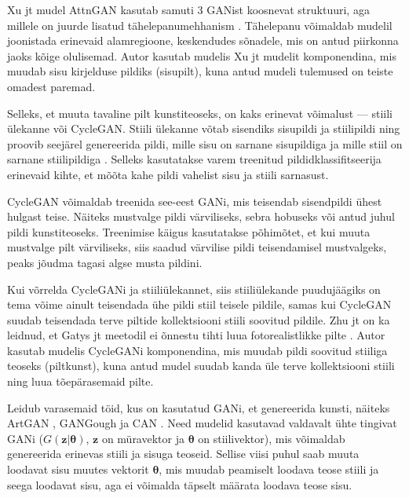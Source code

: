 \documentclass{vilgym}
\begin{document}
	Xu jt mudel AttnGAN kasutab samuti 3 GANist koosnevat struktuuri, aga millele on juurde lisatud tähelepanumehhanism \parencite{attngan}. Tähelepanu võimaldab mudelil joonistada erinevaid alamregioone, keskendudes sõnadele, mis on antud piirkonna jaoks kõige olulisemad. Autor kasutab mudelis Xu jt mudelit komponendina, mis muudab sisu kirjelduse pildiks (sisu\textrightarrow pilt), kuna antud mudeli tulemused on teiste omadest paremad. 

	Selleks, et muuta tavaline pilt kunstiteoseks, on kaks erinevat võimalust --- stiili ülekanne või CycleGAN. Stiili ülekanne võtab sisendiks sisupildi ja stiilipildi ning proovib seejärel genereerida pildi, mille sisu on sarnane sisupildiga ja mille stiil on sarnane stiilipildiga \parencite{styletransfer}.
	Selleks kasutatakse varem treenitud pildidklassifitseerija erinevaid kihte, et mõõta kahe pildi vahelist sisu ja stiili sarnasust. 

	CycleGAN võimaldab treenida see-eest GANi, mis teisendab sisendpildi ühest hulgast teise. Näiteks mustvalge pildi värviliseks, sebra hobuseks või antud juhul pildi kunstiteoseks. Treenimise käigus kasutatakse põhimõtet, et kui muuta mustvalge pilt värviliseks, siis saadud värvilise pildi teisendamisel mustvalgeks, peaks jõudma tagasi algse musta pildini. \parencite{cyclegan}

	Kui võrrelda CycleGANi ja stiiliülekannet, siis stiiliülekande puudujäägiks on tema võime ainult teisendada ühe pildi stiil teisele pildile, samas kui CycleGAN suudab teisendada terve piltide kollektsiooni stiili soovitud pildile. Zhu jt on ka leidnud, et Gatys jt meetodil ei õnnestu tihti luua fotorealistlikke pilte \parencite{cyclegan}. Autor kasutab mudelis CycleGANi komponendina, mis muudab pildi soovitud stiiliga teoseks (pilt\textrightarrow kunst), kuna antud mudel suudab kanda üle terve kollektsiooni stiili ning luua tõepärasemaid pilte.

	Leidub varasemaid töid, kus on kasutatud GANi, et genereerida kunsti, näiteks ArtGAN \parencite{artgan}, GANGough \parencite{gangough} ja CAN \parencite{can}. Need mudelid kasutavad valdavalt ühte tingivat GANi ($ G(\boldsymbol{z}|\boldsymbol{\theta}) $, $ \boldsymbol{z} $ on müravektor ja $ \boldsymbol{\theta} $ on stiilivektor), mis võimaldab genereerida erinevas stiili ja sisuga teoseid. Sellise viisi puhul saab muuta loodavat sisu muutes vektorit $ \boldsymbol{\theta} $, mis muudab peamiselt loodava teose stiili ja seega loodavat sisu, aga ei võimalda täpselt määrata loodava teose sisu. 
\end{document}

